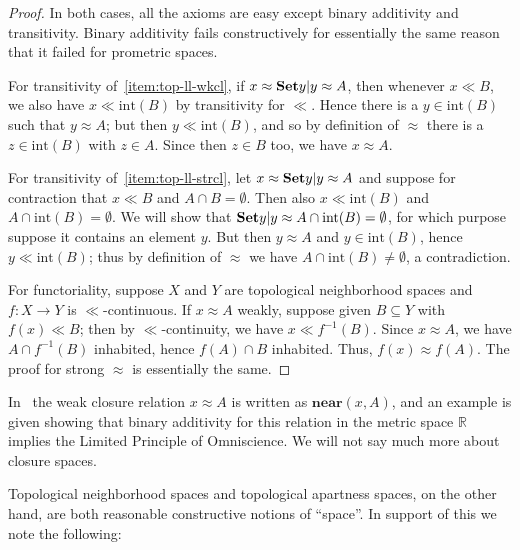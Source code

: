 \documentclass{article}
\def\R{\mathbb{R}}
\def\int{\mathrm{int}}
\def\inv{^{-1}}
\begin{document}
\begin{proof}
  In both cases, all the axioms are easy except binary additivity and transitivity.
  Binary additivity fails constructively for essentially the same reason that it failed for prometric spaces.

  For transitivity of~\ref{item:top-ll-wkcl}, if $x\approx \setof{y | y\approx A}$, then whenever $x\ll B$, we also have $x\ll \int(B)$ by transitivity for $\ll$.
  Hence there is a $y\in \int(B)$ such that $y\approx A$; but then $y\ll \int(B)$, and so by definition of $\approx$ there is a $z\in\int(B)$ with $z\in A$.
  Since then $z\in B$ too, we have $x\approx A$.

  For transitivity of~\ref{item:top-ll-strcl}, let $x\approx \setof{y | y\approx A}$ and suppose for contraction that $x\ll B$ and $A\cap B =\emptyset$.
  Then also $x\ll \int(B)$ and $A\cap \int(B)=\emptyset$.
  We will show that $\setof{y | y\approx A} \cap \int(B) = \emptyset$, for which purpose suppose it contains an element $y$.
  But then $y\approx A$ and $y\in \int(B)$, hence $y\ll \int(B)$; thus by definition of $\approx$ we have $A\cap \int(B) \neq \emptyset$, a contradiction.

  For functoriality, suppose $X$ and $Y$ are topological neighborhood spaces and $f:X\to Y$ is $\ll$-continuous.
  If $x\approx A$ weakly, suppose given $B\subseteq Y$ with $f(x)\ll B$; then by $\ll$-continuity, we have $x\ll f\inv(B)$.
  Since $x\approx A$, we have $A\cap f\inv(B)$ inhabited, hence $f(A) \cap B$ inhabited.
  Thus, $f(x)\approx f(A)$.
  The proof for strong $\approx$ is essentially the same.
\end{proof}

In~\cite{bridges-vita} the weak closure relation $x\approx A$ is written as $\mathbf{near}(x,A)$, and an example is given showing that binary additivity for this relation in the metric space $\R$ implies the Limited Principle of Omniscience.
We will not say much more about closure spaces.

Topological neighborhood spaces and topological apartness spaces, on the other hand, are both reasonable constructive notions of ``space''.
In support of this we note the following:
\end{document}
